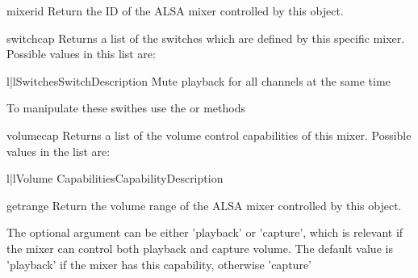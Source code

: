 \begin{methoddesc}[Mixer]{mixerid}{}
  Return the ID of the ALSA mixer controlled by this object.
\end{methoddesc}

\begin{methoddesc}[Mixer]{switchcap}{}
  Returns a list of the switches which are defined by this specific
  mixer. Possible values in this list are:

\begin{tableii}{l|l}{Switches}{Switch}{Description}
  {Mute playback for all channels at the same time}
\end{tableii}

To manipulate these swithes use the  or
 methods
\end{methoddesc}

\begin{methoddesc}[Mixer]{volumecap}{}
  Returns a list of the volume control capabilities of this mixer.
  Possible values in the list are:

\begin{tableii}{l|l}{Volume Capabilities}{Capability}{Description}
\end{tableii}

\end{methoddesc}

\begin{methoddesc}[Mixer]{getrange}{}
  Return the volume range of the ALSA mixer controlled by this object.

  The optional  argument can be either 'playback' or
  'capture', which is relevant if the mixer can control both playback
  and capture volume.  The default value is 'playback' if the mixer
  has this capability, otherwise 'capture'

\end{methoddesc}

